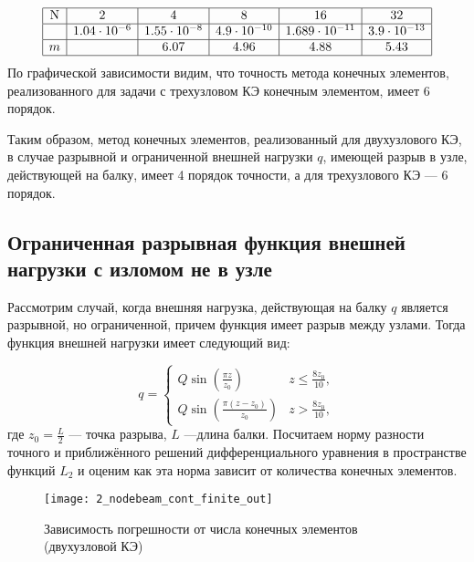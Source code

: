 \documentclass[12pt,a4paper]{article}
\begin{document}
\[
\begin{array}{|c|c|c|c|c|c|}
\hline
\text{N} & 2 & 4 & 8 & 16 & 32 \\ \hline
\Delta  & 1.04 \cdot 10^{-6} & 1.55 \cdot 10^{-8} & 4.9 \cdot 10^{-10} & 1.689 \cdot 10^{-11} & 3.9 \cdot 10^{-13} \\ \hline
m  &  & 6.07 & 4.96 & 4.88 & 5.43 \\ 
\hline
\end{array}
\]
По графической зависимости видим, что точность метода конечных элементов, реализованного для задачи с трехузловом КЭ конечным элементом, имеет 6 порядок. 

Таким образом, метод конечных элементов, реализованный для двухузлового КЭ, в случае разрывной и ограниченной внешней нагрузки $q$, имеющей разрыв в узле, действующей на балку, имеет 4 порядок точности, а для трехузлового КЭ --- 6 порядок. 




\subsection[Ограниченная функция внешней нагрузки с \glqq изломом \grqq не в узле]{Ограниченная разрывная функция внешней нагрузки с \glqq изломом \grqq не в узле}

Рассмотрим случай, когда внешняя нагрузка, действующая на балку $q$ является разрывной, но ограниченной, причем функция имеет разрыв между узлами. 
Тогда функция внешней нагрузки имеет следующий вид:

\begin{equation}
q = 
 \begin{cases}
	Q \sin \left(\frac{\pi  z}{z_{0}}\right) & z \leq \frac{8 z_{0}}{10}, \\
    Q \sin \left(\frac{\pi  (z-z_{0})}{z_{0}}\right) & z > \frac{8 z_{0}}{10},
 \end{cases}
\end{equation}
где $z_{0}=\frac{L}{2}$ --- точка разрыва, $L$ ---длина балки. 
Посчитаем норму разности точного и приближённого решений дифференциального уравнения в пространстве функций $L_{2}$  и оценим как эта норма зависит от количества конечных элементов.\\

\begin{figure}[H]
		\centering
		\texttt{[image: 2\_nodebeam\_cont\_finite\_out]}
		\caption{Зависимость погрешности от числа конечных элементов (двухузловой КЭ)}
		\label{fig:2_nodebeam_cont_finite_out}
	\end{figure}
\end{document}

